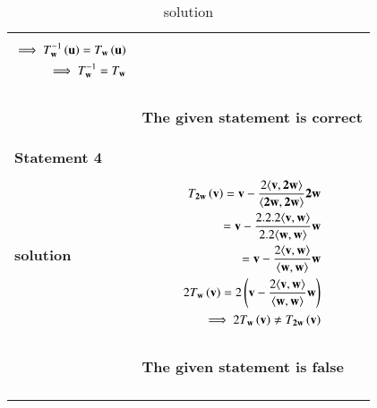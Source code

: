 \documentclass[journal,12pt]{IEEEtran}
\begin{document}
\begin{longtable}{|l|l|}
{\begin{align}
\implies T_\mathbf{w}^{-1}\left(\mathbf{u}\right)= T_\mathbf{w}\left(\mathbf{u}\right)\\
\implies T_\mathbf{w}^{-1}= T_\mathbf{w}
\end{align}}\\
& \parbox{10cm}{\begin{center}
\textbf{The given statement is correct}
\end{center}}\\
\hline 
\textbf{Statement 4} & \\ 
\hline
\textbf{solution}  & \parbox{10cm} {\begin{align}
T_\mathbf{2w}\left(\mathbf{v}\right)=\mathbf{v}-\frac{2\langle \mathbf{v},\mathbf{2w} \rangle}{\langle \mathbf{2w},\mathbf{2w} \rangle}\mathbf{2w}\\
=\mathbf{v}-\frac{2.2.2\langle \mathbf{v},\mathbf{w} \rangle}{2.2\langle \mathbf{w},\mathbf{w} \rangle}\mathbf{w}\\
=\mathbf{v}-\frac{2\langle \mathbf{v},\mathbf{w} \rangle}{\langle \mathbf{w},\mathbf{w} \rangle}\mathbf{w}\\
2T_\mathbf{w}\left(\mathbf{v}\right)=2\left(\mathbf{v}-\frac{2\langle \mathbf{v},\mathbf{w} \rangle}{\langle \mathbf{w},\mathbf{w} \rangle}\mathbf{w}\right)\\
\implies2T_\mathbf{w}\left(\mathbf{v}\right)\neq T_\mathbf{2w}\left(\mathbf{v}\right)
\end{align}}\\
& \parbox{10cm}{\begin{center}
\textbf{The given statement is false}
\end{center}}\\
\hline
\caption{solution}
\label{deftab}
\end{longtable}
\end{document}
